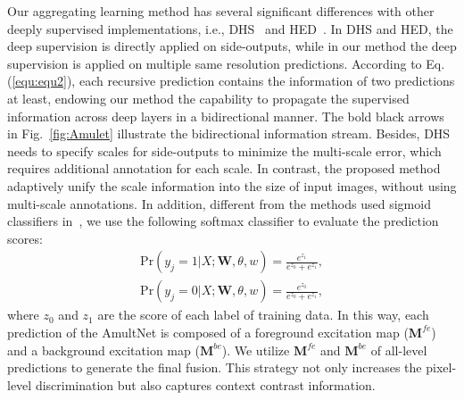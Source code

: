 \documentclass[10pt,twocolumn,letterpaper]{article}
\begin{document}
Our aggregating learning method has several significant differences with other deeply supervised implementations, i.e., DHS~\cite{liu2016dhsnet} and HED~\cite{xie2015holistically}.
%
In DHS and HED, the deep supervision is directly applied on side-outputs, while in our method the deep supervision is applied on multiple same resolution predictions.
%
According to Eq.(\ref{equ:equ2}), each recursive prediction contains the information of two predictions at least, endowing our method the capability to propagate the supervised information across deep layers in a bidirectional manner.
%
The bold black arrows in Fig.~\ref{fig:Amulet} illustrate the bidirectional information stream.
%
Besides, DHS needs to specify scales for side-outputs to minimize the multi-scale error, which requires additional annotation for each scale.
%
In contrast, the proposed method adaptively unify the scale information into the size of input images, without using multi-scale
annotations.
%
In addition, different from the methods used sigmoid classifiers in~\cite{liu2016dhsnet,xie2015holistically}, we use the following softmax classifier to evaluate the prediction scores:
\begin{align}
\text{Pr}(y_{j}=1|X;\textbf{W},\theta,w) = \frac{e^{z_1}}{e^{z_0}+e^{z_1}},
  \label{equ:equ8}
\end{align}
\begin{align}
\text{Pr}(y_{j}=0|X;\textbf{W},\theta,w) = \frac{e^{z_0}}{e^{z_0}+e^{z_1}},
  \label{equ:equ9}
\end{align}
where $z_0$ and $z_1$ are the score of each label of training data. In this way, each prediction of the AmultNet is composed of a foreground excitation map ($\textbf{M}^{fe}$) and a background excitation map ($\textbf{M}^{be}$).
%
We utilize $\textbf{M}^{fe}$ and $\textbf{M}^{be}$ of all-level predictions to generate the final fusion.
%
This strategy not only increases the pixel-level discrimination but also captures context contrast information.
%
\end{document}
